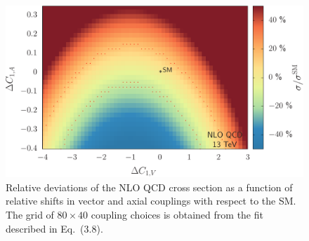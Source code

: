 \documentclass{JHEP3}
\begin{document}
\begin{figure}[t]
\centering
\includegraphics[scale=0.6]{LHC_53_SigmaNLO.pdf}
\caption{ \label{fig:viii} Relative deviations of the NLO QCD cross section as a function of relative shifts in vector and axial couplings with respect to the SM.
The grid of $ 80 \times 40 $ coupling choices is obtained from the fit described in Eq.~(3.8). }
\end{figure}
\end{document}
